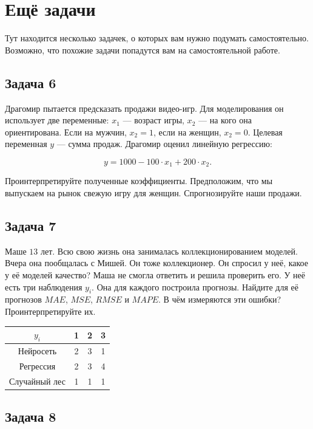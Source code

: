 \documentclass[12pt, a4paper, oneside]{article}
\begin{document}
\section{Ещё задачи} 

Тут находится несколько задачек, о которых вам нужно подумать самостоятельно. Возможно, что похожие задачи попадутся вам на самостоятельной работе.

\subsection*{Задача 6 }

Драгомир пытается предсказать продажи видео-игр.  Для моделирования он использует две переменные: $x_1$ --- возраст игры, $x_2$ --- на кого она ориентирована. Если на мужчин, $x_2=1$, если на женщин, $x_2=0$. Целевая переменная $y$ --- сумма продаж. Драгомир оценил линейную регрессию: 

$$ y = 1000 - 100 \cdot  x_1 + 200 \cdot  x_2.$$

Проинтерпретируйте полученные коэффициенты.  Предположим, что мы выпускаем на рынок свежую игру для женщин. Спрогнозируйте наши продажи. 


\subsection*{Задача  7}

Маше $13$ лет. Всю свою жизнь она занималась коллекционированием моделей.  Вчера она пообщалась с Мишей. Он тоже коллекционер. Он спросил у неё, какое у её моделей качество? Маша не смогла ответить и решила проверить его. У неё есть три наблюдения $y_i$. Она для каждого построила прогнозы. Найдите для её прогнозов $MAE$, $MSE$, $RMSE$ и $MAPE$.  В чём измеряются эти ошибки? Проинтерпретируйте их. 

\begin{center}
	\begin{tabular}{c|c|c|c}
		$y_i$ &  1 & 2 & 3 \\
		\hline
		Нейросеть & 2 & 3 & 1  \\
		Регрессия &  2 & 3 & 4 \\
		Случайный лес & 1 & 1 & 1 \\
	\end{tabular}
\end{center}


\subsection*{Задача 8}
\end{document}
